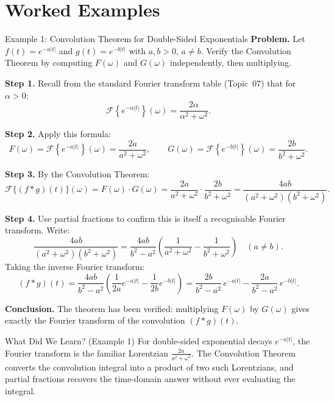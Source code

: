 \documentclass[12pt,a4paper]{article}
\begin{document}
\section{Worked Examples}

\begin{infobox}{Example 1: Convolution Theorem for Double-Sided Exponentials}
\textbf{Problem.} Let $f(t) = e^{-a|t|}$ and $g(t) = e^{-b|t|}$ with $a,b>0$,
$a \neq b$. Verify the Convolution Theorem by computing $F(\omega)$ and $G(\omega)$
independently, then multiplying.

\medskip
\textbf{Step 1.} Recall from the standard Fourier transform table (Topic~07) that
for $\alpha > 0$:
\[
  \mathcal{F}\left\{e^{-\alpha|t|}\right\}(\omega)
  = \frac{2\alpha}{\alpha^2 + \omega^2}.
\]

\textbf{Step 2.} Apply this formula:
\[
  F(\omega) = \mathcal{F}\left\{e^{-a|t|}\right\}(\omega) = \frac{2a}{a^2+\omega^2},
  \qquad
  G(\omega) = \mathcal{F}\left\{e^{-b|t|}\right\}(\omega) = \frac{2b}{b^2+\omega^2}.
\]

\textbf{Step 3.} By the Convolution Theorem:
\[
  \mathcal{F}\{(f*g)(t)\}(\omega) = F(\omega)\cdot G(\omega)
  = \frac{2a}{a^2+\omega^2} \cdot \frac{2b}{b^2+\omega^2}
  = \frac{4ab}{(a^2+\omega^2)(b^2+\omega^2)}.
\]

\textbf{Step 4.} Use partial fractions to confirm this is itself a recognisable
Fourier transform. Write:
\[
  \frac{4ab}{(a^2+\omega^2)(b^2+\omega^2)}
  = \frac{4ab}{b^2-a^2}\left(\frac{1}{a^2+\omega^2} - \frac{1}{b^2+\omega^2}\right)
  \quad (a \neq b).
\]
Taking the inverse Fourier transform:
\[
  (f*g)(t) = \frac{4ab}{b^2-a^2}\left(\frac{1}{2a}e^{-a|t|} - \frac{1}{2b}e^{-b|t|}\right)
  = \frac{2b}{b^2-a^2}\,e^{-a|t|} - \frac{2a}{b^2-a^2}\,e^{-b|t|}.
\]

\textbf{Conclusion.} The theorem has been verified: multiplying $F(\omega)$ by
$G(\omega)$ gives exactly the Fourier transform of the convolution $(f*g)(t)$.
\end{infobox}

\begin{learnbox}{What Did We Learn? (Example 1)}
For double-sided exponential decays $e^{-a|t|}$, the Fourier transform is the
familiar Lorentzian $\frac{2a}{a^2+\omega^2}$. The Convolution Theorem converts
the convolution integral into a product of two such Lorentzians, and partial
fractions recovers the time-domain answer without ever evaluating the integral.
\end{learnbox}
\end{document}
